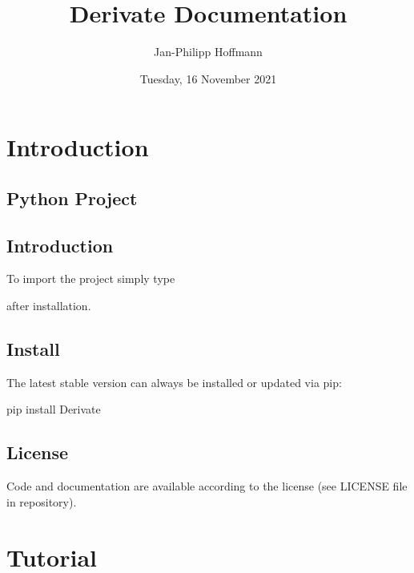 \documentclass[a4paper,10pt,english]{sphinxmanual}
\title{Derivate Documentation}
\date{Tuesday, 16 November 2021}
\author{Jan-Philipp Hoffmann}
\begin{document}
\pagestyle{empty}
\sphinxmaketitle
\pagestyle{plain}
\sphinxtableofcontents
\pagestyle{normal}
\label{\detokenize{index::doc}}



\chapter{Introduction}
\label{\detokenize{intro:introduction}}\label{\detokenize{intro::doc}}
\noindent{}


\section{Python Project }
\label{\detokenize{intro:python-project-derivate}}

\section{Introduction}
\label{\detokenize{intro:id1}}
\sphinxAtStartPar
To import the project simply type

\begin{sphinxVerbatim}[commandchars=\\\{\}]
 
\end{sphinxVerbatim}

\sphinxAtStartPar
after installation.


\section{Install}
\label{\detokenize{intro:install}}
\sphinxAtStartPar
The latest stable version can always be installed or updated via pip:

\begin{sphinxVerbatim}[commandchars=\\\{\}]
\PYGZdl{} pip install Derivate
\end{sphinxVerbatim}


\section{License}
\label{\detokenize{intro:license}}
\sphinxAtStartPar
Code and documentation are available according to the license
(see LICENSE file in repository).


\chapter{Tutorial}
\label{\detokenize{tutorial:tutorial}}\label{\detokenize{tutorial::doc}}
\begin{sphinxVerbatim}[commandchars=\\\{\}]
 
\end{sphinxVerbatim}
\end{document}
